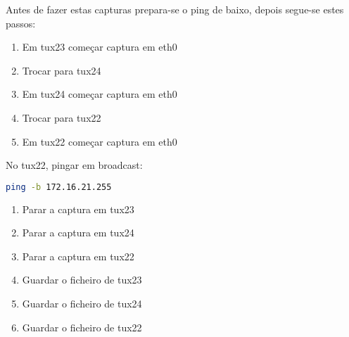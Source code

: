 Antes de fazer estas capturas prepara-se o ping de baixo, depois segue-se estes passos:

\begin{enumerate}
  \item Em tux23 começar captura em eth0
  \item Trocar para tux24
  \item Em tux24 começar captura em eth0
  \item Trocar para tux22
  \item Em tux22 começar captura em eth0
\end{enumerate}

No tux22, pingar em broadcast:
\begin{lstlisting}[language=bash]
ping -b 172.16.21.255
\end{lstlisting}

\begin{enumerate}
  \item Parar a captura em tux23
  \item Parar a captura em tux24
  \item Parar a captura em tux22
  \item Guardar o ficheiro de tux23
  \item Guardar o ficheiro de tux24
  \item Guardar o ficheiro de tux22
\end{enumerate}